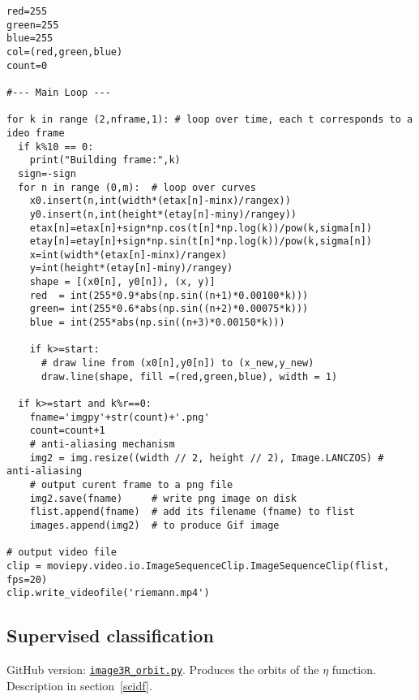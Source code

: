 \documentclass[oneside,10pt]{book}
\begin{document}
\begin{lstlisting}
red=255
green=255
blue=255
col=(red,green,blue)
count=0

#--- Main Loop ---

for k in range (2,nframe,1): # loop over time, each t corresponds to a ideo frame
  if k%10 == 0:
    print("Building frame:",k)
  sign=-sign
  for n in range (0,m):  # loop over curves
    x0.insert(n,int(width*(etax[n]-minx)/rangex))
    y0.insert(n,int(height*(etay[n]-miny)/rangey))
    etax[n]=etax[n]+sign*np.cos(t[n]*np.log(k))/pow(k,sigma[n])
    etay[n]=etay[n]+sign*np.sin(t[n]*np.log(k))/pow(k,sigma[n])
    x=int(width*(etax[n]-minx)/rangex)
    y=int(height*(etay[n]-miny)/rangey)
    shape = [(x0[n], y0[n]), (x, y)]
    red  = int(255*0.9*abs(np.sin((n+1)*0.00100*k)))
    green= int(255*0.6*abs(np.sin((n+2)*0.00075*k)))
    blue = int(255*abs(np.sin((n+3)*0.00150*k)))

    if k>=start:
      # draw line from (x0[n],y0[n]) to (x_new,y_new)
      draw.line(shape, fill =(red,green,blue), width = 1)

  if k>=start and k%r==0:
    fname='imgpy'+str(count)+'.png'
    count=count+1
    # anti-aliasing mechanism
    img2 = img.resize((width // 2, height // 2), Image.LANCZOS) # anti-aliasing
    # output curent frame to a png file
    img2.save(fname)     # write png image on disk
    flist.append(fname)  # add its filename (fname) to flist
    images.append(img2)  # to produce Gif image

# output video file
clip = moviepy.video.io.ImageSequenceClip.ImageSequenceClip(flist, fps=20)
clip.write_videofile('riemann.mp4')
\end{lstlisting}

\subsection{Supervised classification}\label{class222}

GitHub version: \href{https://github.com/VincentGranville/Visualizations/blob/main/Source-Code/image3R_orbit.py}{\texttt{image3R\_orbit.py}}. Produces the orbits of the $\eta$ function. Description in section~\ref{scidf}.
\end{document}

